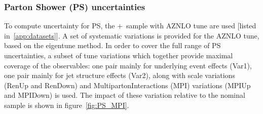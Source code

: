 \subsubsection{Parton Shower (PS) uncertainties}
To compute uncertainty for PS, the \powheg$+$\pythia~sample with AZNLO tune are used [listed in~\ref{app:datasets}]. A set of systematic variations is provided for the AZNLO tune, based on the eigentune method. In order to cover the full range of PS uncertainties, a subset of tune variations which together provide maximal coverage of the observables: one pair mainly for underlying event effects (Var1), one pair mainly for jet structure effects (Var2), along with scale variations (RenUp and RenDown) and MultipartonInteractions (MPI) variations (MPIUp and MPIDown) is used. The impact of these variation relative to the nominal sample is shown in figure~\ref{fig:PS_MPI}.

